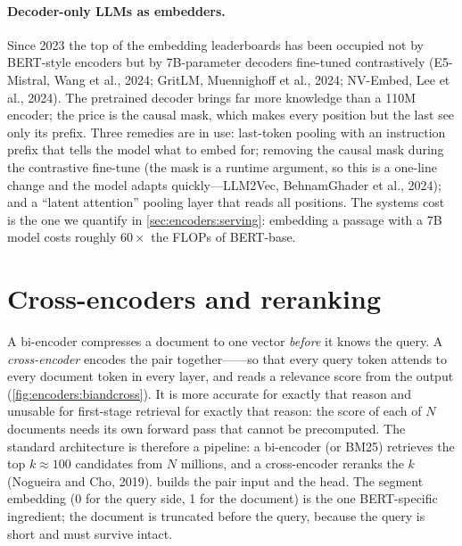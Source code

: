 \paragraph{Decoder-only LLMs as embedders.} Since 2023 the top of the embedding leaderboards has been
occupied not by BERT-style encoders but by 7B-parameter decoders fine-tuned contrastively (E5-Mistral,
Wang et al., 2024; GritLM, Muennighoff et al., 2024; NV-Embed, Lee et al., 2024). The pretrained
decoder brings far more knowledge than a 110M encoder; the price is the causal mask, which makes
every position but the last see only its prefix. Three remedies are in use: last-token pooling with
an instruction prefix that tells the model what to embed for; removing the causal mask during the
contrastive fine-tune (the mask is a runtime argument, so this is a one-line change and the model
adapts quickly---LLM2Vec, BehnamGhader et al., 2024); and a ``latent attention'' pooling layer that
reads all positions. The systems cost is the one we quantify in \cref{sec:encoders:serving}: embedding
a passage with a 7B model costs roughly $60\times$ the FLOPs of BERT-base.

\section{Cross-encoders and reranking}\label{sec:encoders:rerank}

A bi-encoder compresses a document to one vector \emph{before} it knows the query. A
\emph{cross-encoder} encodes the pair together------so that
every query token attends to every document token in every layer, and reads a relevance score from
the \code{[CLS]} output (\cref{fig:encoders:biandcross}). It is more accurate for exactly that reason
and unusable for first-stage retrieval for exactly that reason: the score of each of $N$ documents
needs its own forward pass that cannot be precomputed. The standard architecture is therefore a
pipeline: a bi-encoder (or BM25) retrieves the top $k\approx100$ candidates from $N$ millions, and a
cross-encoder reranks the $k$ (Nogueira and Cho, 2019).  builds the
pair input and the head. The segment embedding (0 for the query side, 1 for the document) is the one
BERT-specific ingredient; the document is truncated before the query, because the query is short and
must survive intact.

